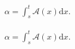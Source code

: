 \begin{align*}
  \alpha = \int_s^t \mathcal{A}(x) \mathrm{d}x.
\end{align*}

\begin{align*}
  \alpha = \int_s^t \mathcal{A}(x) \mathrm{d} x.
\end{align*}

